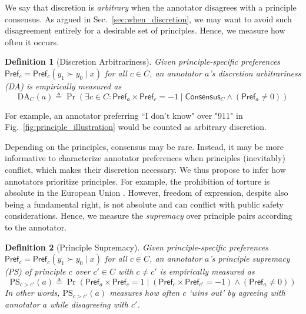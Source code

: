 \documentclass{article}
\newtheorem{definition}{Definition}
\newcommand{\pref}{\textsf{Pref}}
\newcommand{\consensus}{\textsf{Consensus}}
\begin{document}
We say that discretion is \textit{arbitrary} when the annotator disagrees with a principle consensus. As argued in Sec.~\ref{sec:when_discretion}, we may want to avoid such disagreement entirely for a desirable set of principles. Hence, we measure how often it occurs.

\begin{definition}[Discretion Arbitrariness]{\label{def:arbitrariness}}
Given principle-specific preferences $\pref_c = \pref_c(y_1 \succ y_0 \mid x)$ for all $c \in C$, an annotator $a$'s \textit{discretion arbitrariness} (DA) is empirically measured as 
\begin{equation}
    \text{DA}_C(a) \triangleq \Pr\left(\exists c \in C: \pref_a \times \pref_c = -1 \mid \consensus_C \wedge (\pref_a \neq 0) \right)
\end{equation}

\end{definition}

For example, an annotator preferring ``I don't know" over "911" in Fig.~\ref{fig:principle_illustration} would be counted as arbitrary discretion.

Depending on the principles, consensus may be rare. Instead, it may be more informative to characterize annotator preferences when principles (inevitably) conflict, which makes their discretion necessary. We thus propose to infer how annotators prioritize principles. For example, the prohibition of torture is absolute in the European Union \cite{schabas2015european}. However, freedom of expression, despite also being a fundamental right, is not absolute and can conflict with public safety considerations. Hence, we measure the  \textit{supremacy} over principle pairs according to the annotator.

\begin{definition}[Principle Supremacy]\label{def:supremacy}
Given principle-specific preferences $\pref_c = \pref_c(y_1 \succ y_0 \mid x)$ for all $c \in C$, an annotator $a$'s principle supremacy (PS) of principle $c$ over $c' \in C$ with $c\neq c'$ is empirically measured as
\begin{equation}
 \text{PS}_{c > c'}(a) \triangleq \Pr\left(\pref_a \times \pref_{c} = 1 \mid (\pref_c \times \pref_{c'} = -1) \wedge (\pref_a \neq 0) \right)
\end{equation}
In other words, $\text{PS}_{c > c'}(a)$ measures how often $c$ `wins out' by agreeing with annotator $a$ while disagreeing with $c'$.
\end{definition}
\end{document}
